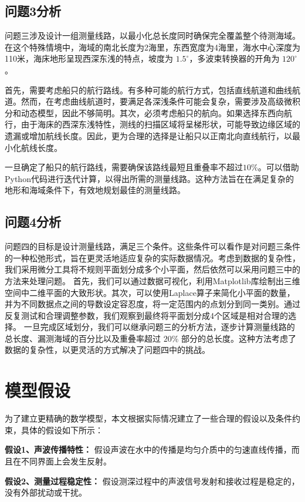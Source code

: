 \documentclass{cumcmthesis}
\begin{document}
\subsection{问题3分析}
问题三涉及设计一组测量线路，以最小化总长度同时确保完全覆盖整个待测海域。在这个特殊情境中，海域的南北长度为2海里，东西宽度为4海里，海水中心深度为110米，海床地形呈现西深东浅的特点，坡度为 $1.5^\circ$，多波束转换器的开角为 $120^\circ$。

首先，需要考虑船只的航行路线。有多种可能的航行方式，包括直线航道和曲线航道。然而，在考虑曲线航道时，要满足各深浅条件可能会复杂，需要涉及高级微积分和动态模型，因此不够简明。其次，必须考虑船只的航向。如果选择东西向航行，由于海床的西深东浅特性，测线的扫描区域将呈梯形状，可能导致边缘区域的遗漏或增加航线长度。因此，更为合理的选择是让船只以正南北向直线航行，以最小化航线长度。

一旦确定了船只的航行路线，需要确保该路线最短且重叠率不超过$10\%$。可以借助Python代码进行迭代计算，以得出所需的测量线路。这种方法旨在在满足复杂的地形和海域条件下，有效地规划最佳的测量线路。

\subsection{问题4分析}
问题四的目标是设计测量线路，满足三个条件。这些条件可以看作是对问题三条件的一种松弛形式，旨在更灵活地适应复杂的实际数据情况。考虑到数据的复杂性，我们采用微分工具将不规则平面划分成多个小平面，然后依然可以采用问题三中的方法来处理问题。
首先，我们可以通过数据可视化，利用Matplotlib库绘制出三维空间中二维平面的大致形状。其次，可以使用Laplace算子来简化小平面的数量，并为不同数据点之间的导数设定容忍度，将一定范围内的点划分到同一类别。通过反复测试和合理调整参数，我们观察到最终将平面划分成4个区域是相对合理的选择。
一旦完成区域划分，我们可以继承问题三的分析方法，逐步计算测量线路的总长度、漏测海域的百分比以及重叠率超过 $20\%$ 部分的总长度。这种方法考虑了数据的复杂性，以更灵活的方式解决了问题四中的挑战。

\section{模型假设}
为了建立更精确的数学模型，本文根据实际情况建立了一些合理的假设以及条件约束，具体的假设如下所示：

\textbf{假设1、声波传播特性：} 假设声波在水中的传播是均匀介质中的匀速直线传播，而且在不同界面上会发生反射。

\textbf{假设2、测量过程稳定性：} 假设测深过程中的声波信号发射和接收过程是稳定的，没有外部扰动或干扰。
\end{document}
